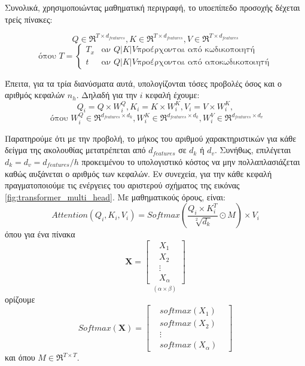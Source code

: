 Συνολικά, χρησιμοποιώντας μαθηματική περιγραφή, το υποεπίπεδο προσοχής δέχεται τρείς πίνακες:

\begin{equation}
  Q \in \Re^{T \times d_{features}},K \in \Re^{T \times d_{features}}, V \in \Re^{T \times d_{features}}
\end{equation}
\begin{equation}
  \text{όπου } T = \begin{cases} 
    T_x & \text{αν } Q | K | V \text{προέρχονται από κωδικοποιητή}\\
    t & \text{αν } Q | K | V \text{προέρχονται από αποκωδικοποιητή}
  \end{cases} 
\end{equation}
 

  
  Έπειτα, για τα τρία διανύσματα αυτά, υπολογίζονται τόσες προβολές όσος και ο αριθμός κεφαλών $n_h$. Δηλαδή για την $i$ κεφαλή έχουμε:
  \begin{equation}
    Q_i = Q\times W_i^Q, K_i = K \times W_i^K, V_i = V \times W_i^K,
  \end{equation}
  \begin{equation}
    \text{ όπου } W_i^Q \in \Re^{d_{features} \times d_k}, W_i^K \in \Re^{d_{features} \times d_k}, W_i^V \in \Re^{d_{features} \times d_v}
  \end{equation}

  Παρατηρούμε ότι με την προβολή, το μήκος του αριθμού χαρακτηριστικών για κάθε δείγμα της ακολουθίας μετατρέπεται από $d_{features}$ σε $d_k$ ή $d_v$. Συνήθως, επιλέγεται $d_k = d_v = d_{features}/h$ προκειμένου το υπολογιστικό κόστος να μην πολλαπλασιάζεται καθώς αυξάνεται ο αριθμός των κεφαλών.
  Εν συνεχεία, για την κάθε κεφαλή πραγματοποιούμε τις ενέργειες του αριστερού σχήματος της εικόνας \ref{fig:transformer_multi_head}. Με μαθηματικούς όρους, είναι:
  \[
    Attention(Q_i, K_i, V_i) = Softmax(\frac{Q_i\times K_i^T}{\sqrt[2]{d_k}} \odot M) \times V_i
    \]
    όπου για ένα πίνακα 
    \[ 
      \boldsymbol{X} = \underset{(\alpha \times \beta)}{\begin{bmatrix}
        & X_1 &  \\
        & X_2 &  \\
        & \vdots & \\
        & X_{\alpha} &  
      \end{bmatrix}}
      \] 
      ορίζουμε
    \[
      Softmax(\boldsymbol{X}) =
      \begin{bmatrix}
        & softmax(X_1) &  \\
        & softmax(X_2) &  \\
        & \vdots & \\
        & softmax(X_{\alpha}) &  
      \end{bmatrix}
        \]
        και όπου $M \in \Re^{T \times T}$.

